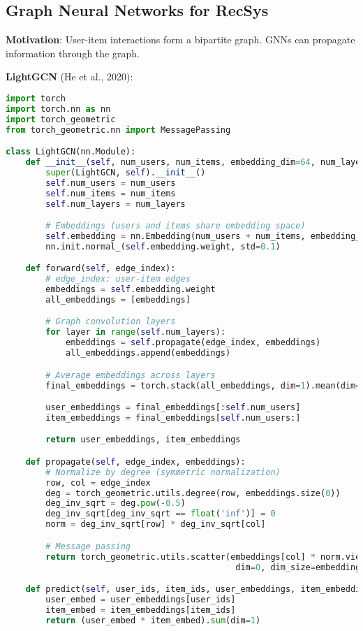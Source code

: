 \documentclass[10pt]{article}
\begin{document}
\subsection{Graph Neural Networks for RecSys}

\textbf{Motivation}: User-item interactions form a bipartite graph. GNNs can propagate information through the graph.

\textbf{LightGCN} (He et al., 2020):
\begin{lstlisting}[language=Python]
import torch
import torch.nn as nn
import torch_geometric
from torch_geometric.nn import MessagePassing

class LightGCN(nn.Module):
    def __init__(self, num_users, num_items, embedding_dim=64, num_layers=3):
        super(LightGCN, self).__init__()
        self.num_users = num_users
        self.num_items = num_items
        self.num_layers = num_layers

        # Embeddings (users and items share embedding space)
        self.embedding = nn.Embedding(num_users + num_items, embedding_dim)
        nn.init.normal_(self.embedding.weight, std=0.1)

    def forward(self, edge_index):
        # edge_index: user-item edges
        embeddings = self.embedding.weight
        all_embeddings = [embeddings]

        # Graph convolution layers
        for layer in range(self.num_layers):
            embeddings = self.propagate(edge_index, embeddings)
            all_embeddings.append(embeddings)

        # Average embeddings across layers
        final_embeddings = torch.stack(all_embeddings, dim=1).mean(dim=1)

        user_embeddings = final_embeddings[:self.num_users]
        item_embeddings = final_embeddings[self.num_users:]

        return user_embeddings, item_embeddings

    def propagate(self, edge_index, embeddings):
        # Normalize by degree (symmetric normalization)
        row, col = edge_index
        deg = torch_geometric.utils.degree(row, embeddings.size(0))
        deg_inv_sqrt = deg.pow(-0.5)
        deg_inv_sqrt[deg_inv_sqrt == float('inf')] = 0
        norm = deg_inv_sqrt[row] * deg_inv_sqrt[col]

        # Message passing
        return torch_geometric.utils.scatter(embeddings[col] * norm.view(-1, 1), row,
                                              dim=0, dim_size=embeddings.size(0), reduce='sum')

    def predict(self, user_ids, item_ids, user_embeddings, item_embeddings):
        user_embed = user_embeddings[user_ids]
        item_embed = item_embeddings[item_ids]
        return (user_embed * item_embed).sum(dim=1)
\end{lstlisting}
\end{document}
